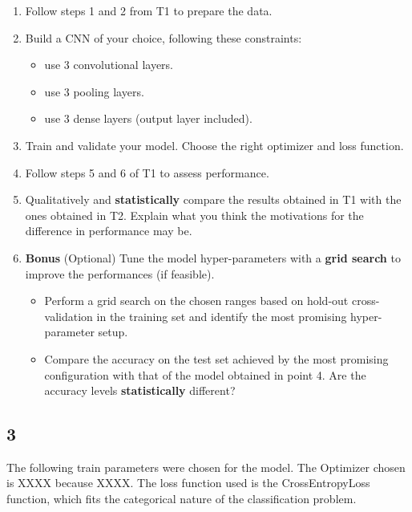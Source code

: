 \documentclass[11pt]{scrartcl}
\begin{document}
\begin{enumerate}
\item Follow steps 1 and 2 from T1 to prepare the data.

\item Build a CNN of your choice, following these constraints: 

	\begin{itemize}
	\item use 3 convolutional layers.
	\item use 3 pooling layers.
	\item use 3 dense layers (output layer included).
	\end{itemize}

\item Train and validate your model. Choose the right optimizer and loss function. 

\item Follow steps 5 and 6 of T1 to assess performance.

\item Qualitatively and \textbf{statistically} compare the results 
obtained in T1 with the ones obtained in T2. 
Explain what you think the motivations for the difference in performance may be.

\item \textbf{Bonus} (Optional) 
Tune the model hyper-parameters with a \textbf{grid search} 
to improve the performances (if feasible).

	\begin{itemize}
	\item Perform a grid search on the chosen ranges based on hold-out cross-validation 
	in the training set and identify the most promising hyper-parameter setup.

	\item Compare the accuracy on the test set achieved by the most promising configuration 
	with that of the model obtained in point 4. 
	Are the accuracy levels \textbf{statistically} different?
	\end{itemize}
\end{enumerate}

\subsection*{3}

The following train parameters were chosen for the model.
The Optimizer chosen is XXXX because XXXX.
The loss function used is the CrossEntropyLoss function, 
which fits the categorical nature of the classification problem.
\end{document}
